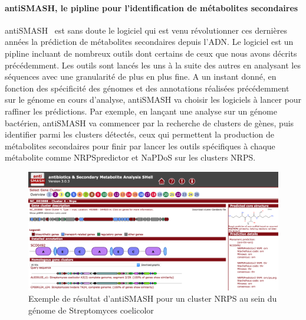 \documentclass[12pt,french,twoside]{report}
\begin{document}
\paragraph{antiSMASH, le pipline pour l'identification de métabolites secondaires}
antiSMASH~\cite{weber_antismash_2015,medema_antismash:_2011} est sans doute le logiciel qui est venu révolutionner ces dernières années la prédiction de métabolites secondaires depuis l'ADN.
Le logiciel est un pipline incluant de nombreux outils dont certains de ceux que nous avons décrits précédemment.
Les outils sont lancés les uns à la suite des autres en analysant les séquences avec une granularité de plus en plus fine.
A un instant donné, en fonction des spécificité des génomes et des annotations réalisées précédemment sur le génome en cours d'analyse, antiSMASH va choisir les logiciels à lancer pour raffiner les prédictions.
Par exemple, en lançant une analyse sur un génome bactérien, antiSMASH va commencer par la recherche de clusters de gènes, puis identifier parmi les clusters détectés, ceux qui permettent la production de métabolites secondaires pour finir par lancer les outils spécifiques à chaque métabolite comme NRPSpredictor et NaPDoS sur les clusters NRPS.

\begin{figure}
  \begin{center}
    \includegraphics[width=450px]{Figures/bio/Bioinfo/antismash_example.png}
    \caption{\label{antismash_result}Exemple de résultat d'antiSMASH pour un cluster NRPS au sein du génome de Streptomyces coelicolor}
  \end{center}
\end{figure}
\end{document}
